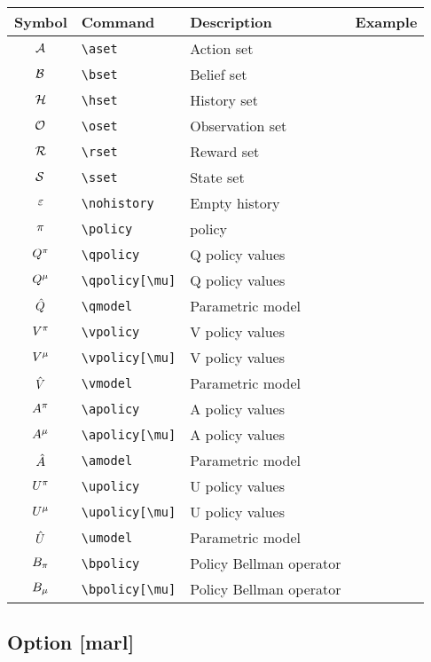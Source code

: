 \documentclass{article}
\begin{document}
\begin{tabular}{clll}
  \toprule
  Symbol & Command & Description & Example \\
  \midrule
  $\aset$ & \verb|\aset| & Action set \\
  $\bset$ & \verb|\bset| & Belief set \\
  $\hset$ & \verb|\hset| & History set \\
  $\oset$ & \verb|\oset| & Observation set \\
  $\rset$ & \verb|\rset| & Reward set \\
  $\sset$ & \verb|\sset| & State set \\
  \midrule
  $\nohistory$ & \verb|\nohistory| & Empty history \\
  \midrule
  $\policy$ & \verb|\policy| & policy \\
  \midrule
  $\qpolicy$ & \verb|\qpolicy| & Q policy values \\
  $\qpolicy[\mu]$ & \verb|\qpolicy[\mu]| & Q policy values \\
  $\qmodel$ & \verb|\qmodel| & Parametric model \\
  \midrule
  $\vpolicy$ & \verb|\vpolicy| & V policy values \\
  $\vpolicy[\mu]$ & \verb|\vpolicy[\mu]| & V policy values \\
  $\vmodel$ & \verb|\vmodel| & Parametric model \\
  \midrule
  $\apolicy$ & \verb|\apolicy| & A policy values \\
  $\apolicy[\mu]$ & \verb|\apolicy[\mu]| & A policy values \\
  $\amodel$ & \verb|\amodel| & Parametric model \\
  \midrule
  $\upolicy$ & \verb|\upolicy| & U policy values \\
  $\upolicy[\mu]$ & \verb|\upolicy[\mu]| & U policy values \\
  $\umodel$ & \verb|\umodel| & Parametric model \\
  \midrule
  $\bpolicy$ & \verb|\bpolicy| & Policy Bellman operator \\
  $\bpolicy[\mu]$ & \verb|\bpolicy[\mu]| & Policy Bellman operator \\
  \bottomrule
\end{tabular}

\subsection*{Option [marl]}
\end{document}
